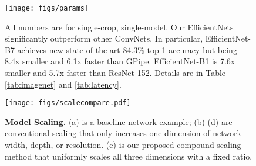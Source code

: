 \documentclass{article}
\begin{document}
\begin{figure}[t]
	\texttt{[image: figs/params]}
	\hspace{-44mm}
    \vskip -0.15in
	\caption{ All numbers are for single-crop, single-model. Our EfficientNets significantly outperform other ConvNets. In particular,  EfficientNet-B7 achieves new state-of-the-art 84.3\% top-1 accuracy but being 8.4x smaller and 6.1x faster than GPipe. EfficientNet-B1 is 7.6x smaller and 5.7x faster than ResNet-152. Details are in Table \ref{tab:imagenet} and \ref{tab:latency}.}
	\label{fig:imagnet-params}
\end{figure}
\begin{figure*}                                                          
        \centering
        \texttt{[image: figs/scalecompare.pdf]} 
        \caption{\textbf{Model Scaling.} (a) is a baseline network example; (b)-(d) are conventional scaling that only increases one dimension of  network width, depth, or resolution. (e) is our proposed compound scaling method that uniformly scales all three dimensions with a fixed ratio.}                                                                        
        \label{fig:scalecompare}   

\end{figure*}  
\end{document}
